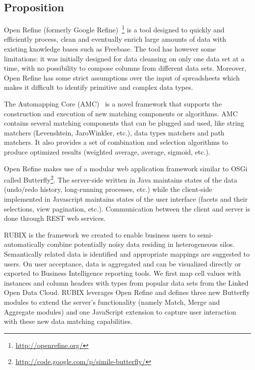 
\subsection{Proposition}

Open Refine (formerly Google Refine)~\footnote{\url{http://openrefine.org/}} is a tool designed to quickly and efficiently process, clean and eventually enrich large amounts of data with existing knowledge bases such as Freebase. The tool has however some limitations: it was initially designed for data cleansing on only one data set at a time, with no possibility to compose columns from different data sets. Moreover, Open Refine has some strict assumptions over the input of spreadsheets which makes it difficult to identify primitive and complex data types.

The Automapping Core (AMC)~\cite{Peukert:ICDE:12} is a novel framework that supports the construction and execution of new matching components or algorithms. AMC contains several matching components that can be plugged and used, like string matchers (Levenshtein, JaroWinkler, etc.), data types matchers and path matchers. It also provides a set of combination and selection algorithms to produce optimized results (weighted average, average, sigmoid,  etc.).

Open Refine makes use of a modular web application framework similar to OSGi called Butterfly\footnote{\url{http://code.google.com/p/simile-butterfly/}}. The server-side written in Java maintains states of the data (undo/redo history, long-running processes, etc.) while the client-side implemented in Javascript maintains states of the user interface (facets and their selections, view pagination, etc.). Communication between the client and server is done through REST web services.

RUBIX is the framework we created to enable business users to semi-automatically combine potentially noisy data residing in heterogeneous silos. Semantically related data is identified and appropriate mappings are suggested to users. On user acceptance, data is aggregated and can be visualized directly or exported to Business Intelligence reporting tools. We first map cell values with instances and column headers with types from popular data sets from the Linked Open Data Cloud. RUBIX leverages Open Refine and defines three new Butterfly modules to extend the server's functionality (namely Match, Merge and Aggregate modules) and one JavaScript extension to capture user interaction with these new data matching capabilities.

